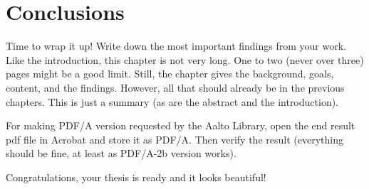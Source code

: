 \chapter{Conclusions}
\label{chapter:conclusions}

Time to wrap it up!  Write down the most important findings from your
work.  Like the introduction, this chapter is not very long.  One to
two (never over three) pages might be a good limit. Still, the chapter
gives the background, goals, content, and the findings. However, all that
should already be in the previous chapters. This is just a summary (as
are the abstract and the introduction).

For making PDF/A version requested by the Aalto Library, open the end result pdf file in Acrobat and store it as PDF/A. Then verify the result (everything should be fine, at least as PDF/A-2b version works).

Congratulations, your thesis is ready and it looks beautiful!
